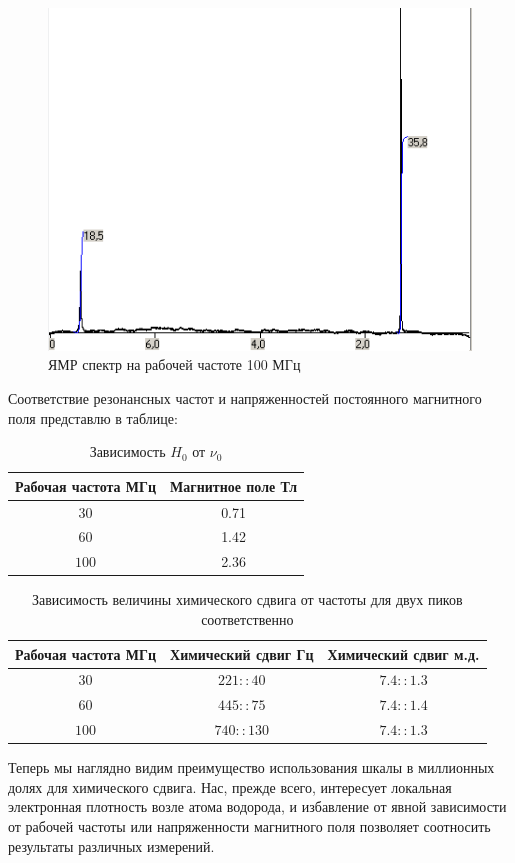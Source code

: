 \begin{figure}[h!]
	\centering
	\includegraphics[width=0.6\linewidth]{pict3}
	\caption{ЯМР спектр на рабочей частоте 100 МГц}
	\label{fig:pict3}
\end{figure}

Соответствие резонансных частот и напряженностей постоянного магнитного поля представлю в таблице:

\begin{table}[h!]
	\caption{Зависимость $H_0$ от $\nu_0$}
	\label{table:1}
	\centering
	\begin{tabular}{|c|c|}
		\toprule
		Рабочая частота МГц &  Магнитное поле Тл  \\
		\midrule
		$30$  	&  0.71   \\
		$60$  	&  1.42   \\
		$100$ 	&  2.36   \\
		\bottomrule
	\end{tabular}
\end{table}

\begin{table}[h!]
	\caption{Зависимость величины химического сдвига от частоты для двух пиков соответственно}
	\label{table:2}
	\centering
	\begin{tabular}{|c|c|c|}
		\toprule
		Рабочая частота МГц & Химический сдвиг Гц & Химический сдвиг м.д.    \\
		\midrule
		$30$  	& $221 :: 40$  & $7.4 :: 1.3$ \\
		$60$  	&  $445 :: 75$ & $7.4 :: 1.4$ \\ 
		$100$ 	& $ 740:: 130$ & $7.4 :: 1.3$ \\
		\bottomrule
	\end{tabular}
\end{table}

Теперь мы наглядно видим преимущество использования шкалы в миллионных долях для химического сдвига.
Нас, прежде всего, интересует локальная электронная плотность возле атома водорода, и избавление от явной зависимости от рабочей частоты или напряженности магнитного поля позволяет соотносить результаты различных измерений.

